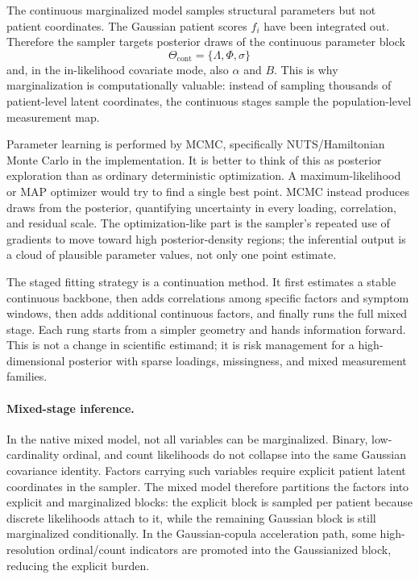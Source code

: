 The continuous marginalized model samples structural parameters but not patient coordinates. The Gaussian
patient scores $f_i$ have been integrated out. Therefore the sampler targets posterior draws of the continuous
parameter block
\begin{equation}
\Theta_{\mathrm{cont}}=\{\Lambda,\Phi,\sigma\}
\end{equation}
and, in the in-likelihood covariate mode, also $\alpha$ and $B$. This is why marginalization is computationally
valuable: instead of sampling thousands of patient-level latent coordinates, the continuous stages sample the
population-level measurement map.

Parameter learning is performed by MCMC, specifically NUTS/Hamiltonian Monte Carlo in the implementation. It is
better to think of this as posterior exploration than as ordinary deterministic optimization. A maximum-likelihood
or MAP optimizer would try to find a single best point. MCMC instead produces draws from the posterior,
quantifying uncertainty in every loading, correlation, and residual scale. The optimization-like part is the
sampler's repeated use of gradients to move toward high posterior-density regions; the inferential output is a
cloud of plausible parameter values, not only one point estimate.

The staged fitting strategy is a continuation method. It first estimates a stable continuous backbone, then adds
correlations among specific factors and symptom windows, then adds additional continuous factors, and finally
runs the full mixed stage. Each rung starts from a simpler geometry and hands information forward. This is not a
change in scientific estimand; it is risk management for a high-dimensional posterior with sparse loadings,
missingness, and mixed measurement families.

\paragraph{Mixed-stage inference.} In the native mixed model, not all variables can be marginalized. Binary,
low-cardinality ordinal, and count likelihoods do not collapse into the same Gaussian covariance identity.
Factors carrying such variables require explicit patient latent coordinates in the sampler. The mixed model
therefore partitions the factors into explicit and marginalized blocks: the explicit block is sampled per
patient because discrete likelihoods attach to it, while the remaining Gaussian block is still marginalized
conditionally. In the Gaussian-copula acceleration path, some high-resolution ordinal/count indicators are
promoted into the Gaussianized block, reducing the explicit burden.

